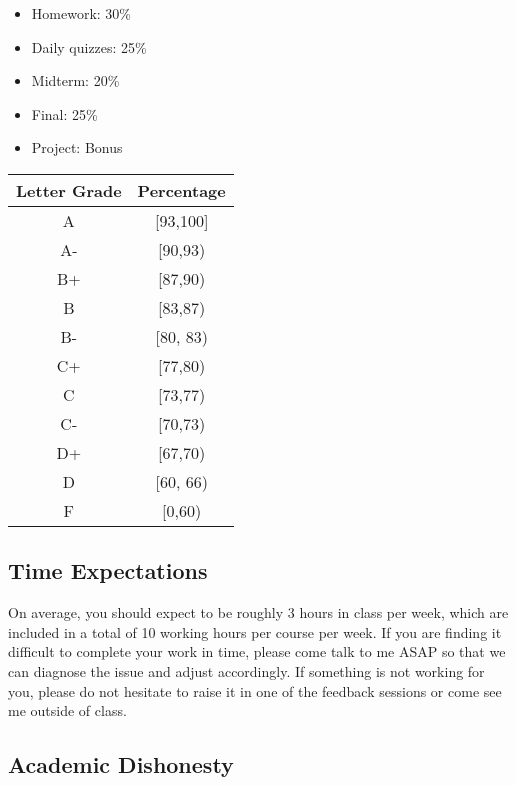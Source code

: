 \documentclass[
]{article}
\providecommand{\tightlist}{%
  \setlength{\itemsep}{0pt}\setlength{\parskip}{0pt}}
\begin{document}
\begin{itemize}
\tightlist
\item
  Homework: 30\%
\item
  Daily quizzes: 25\%
\item
  Midterm: 20\%
\item
  Final: 25\%
\item
  Project: Bonus
\end{itemize}

\begin{longtable}[]{@{}cc@{}}
\toprule\noalign{}
\textbf{Letter Grade} & \textbf{Percentage} \\
\midrule\noalign{}
\endhead
\bottomrule\noalign{}
\endlastfoot
A & {[}93,100{]} \\
A- & {[}90,93) \\
B+ & {[}87,90) \\
B & {[}83,87) \\
B- & {[}80, 83) \\
C+ & {[}77,80) \\
C & {[}73,77) \\
C- & {[}70,73) \\
D+ & {[}67,70) \\
D & {[}60, 66) \\
F & {[}0,60) \\
\end{longtable}

\hypertarget{time-expectations}{%
\subsection*{Time Expectations}\label{time-expectations}}

On average, you should expect to be roughly 3 hours in class per week, which are included in a total of 10 working hours per course per week. If you are finding it difficult to complete your work in time, please come talk to me ASAP so that we can diagnose the issue and adjust accordingly. If something is not working for you, please do not hesitate to raise it in one of the feedback sessions or come see me outside of class.

\hypertarget{academic-dishonesty}{%
\subsection*{Academic Dishonesty}\label{academic-dishonesty}}
\end{document}
